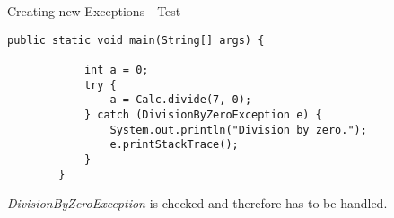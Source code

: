 \begin{frame}[fragile]{Creating new Exceptions - Test}
	\begin{lstlisting}[basicstyle=\ttfamily\scriptsize]
		public static void main(String[] args) {
			
			int a = 0;
			try {
				a = Calc.divide(7, 0);
			} catch (DivisionByZeroException e) {
				System.out.println("Division by zero.");
				e.printStackTrace();
			}
		}
	\end{lstlisting}	
	\emph{DivisionByZeroException} is checked and therefore has to be handled.
\end{frame}
	
	
	
